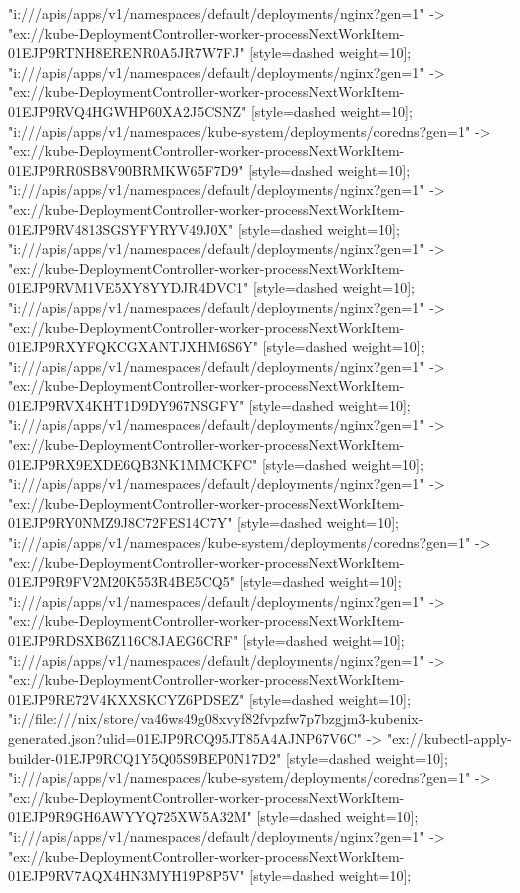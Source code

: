 {"i:///apis/apps/v1/namespaces/default/deployments/nginx?gen=1" -> "ex://kube-DeploymentController-worker-processNextWorkItem-01EJP9RTNH8ERENR0A5JR7W7FJ" [style=dashed weight=10];
"i:///apis/apps/v1/namespaces/default/deployments/nginx?gen=1" -> "ex://kube-DeploymentController-worker-processNextWorkItem-01EJP9RVQ4HGWHP60XA2J5CSNZ" [style=dashed weight=10];
"i:///apis/apps/v1/namespaces/kube-system/deployments/coredns?gen=1" -> "ex://kube-DeploymentController-worker-processNextWorkItem-01EJP9RR0SB8V90BRMKW65F7D9" [style=dashed weight=10];
"i:///apis/apps/v1/namespaces/default/deployments/nginx?gen=1" -> "ex://kube-DeploymentController-worker-processNextWorkItem-01EJP9RV4813SGSYFYRYV49J0X" [style=dashed weight=10];
"i:///apis/apps/v1/namespaces/default/deployments/nginx?gen=1" -> "ex://kube-DeploymentController-worker-processNextWorkItem-01EJP9RVM1VE5XY8YYDJR4DVC1" [style=dashed weight=10];
"i:///apis/apps/v1/namespaces/default/deployments/nginx?gen=1" -> "ex://kube-DeploymentController-worker-processNextWorkItem-01EJP9RXYFQKCGXANTJXHM6S6Y" [style=dashed weight=10];
"i:///apis/apps/v1/namespaces/default/deployments/nginx?gen=1" -> "ex://kube-DeploymentController-worker-processNextWorkItem-01EJP9RVX4KHT1D9DY967NSGFY" [style=dashed weight=10];
"i:///apis/apps/v1/namespaces/default/deployments/nginx?gen=1" -> "ex://kube-DeploymentController-worker-processNextWorkItem-01EJP9RX9EXDE6QB3NK1MMCKFC" [style=dashed weight=10];
"i:///apis/apps/v1/namespaces/default/deployments/nginx?gen=1" -> "ex://kube-DeploymentController-worker-processNextWorkItem-01EJP9RY0NMZ9J8C72FES14C7Y" [style=dashed weight=10];
"i:///apis/apps/v1/namespaces/kube-system/deployments/coredns?gen=1" -> "ex://kube-DeploymentController-worker-processNextWorkItem-01EJP9R9FV2M20K553R4BE5CQ5" [style=dashed weight=10];
"i:///apis/apps/v1/namespaces/default/deployments/nginx?gen=1" -> "ex://kube-DeploymentController-worker-processNextWorkItem-01EJP9RDSXB6Z116C8JAEG6CRF" [style=dashed weight=10];
"i:///apis/apps/v1/namespaces/default/deployments/nginx?gen=1" -> "ex://kube-DeploymentController-worker-processNextWorkItem-01EJP9RE72V4KXXSKCYZ6PDSEZ" [style=dashed weight=10];
"i://file:///nix/store/va46ws49g08xvyf82fvpzfw7p7bzgjm3-kubenix-generated.json?ulid=01EJP9RCQ95JT85A4AJNP67V6C" -> "ex://kubectl-apply-builder-01EJP9RCQ1Y5Q05S9BEP0N17D2" [style=dashed weight=10];
"i:///apis/apps/v1/namespaces/kube-system/deployments/coredns?gen=1" -> "ex://kube-DeploymentController-worker-processNextWorkItem-01EJP9R9GH6AWYYQ725XW5A32M" [style=dashed weight=10];
"i:///apis/apps/v1/namespaces/default/deployments/nginx?gen=1" -> "ex://kube-DeploymentController-worker-processNextWorkItem-01EJP9RV7AQX4HN3MYH19P8P5V" [style=dashed weight=10];
}
